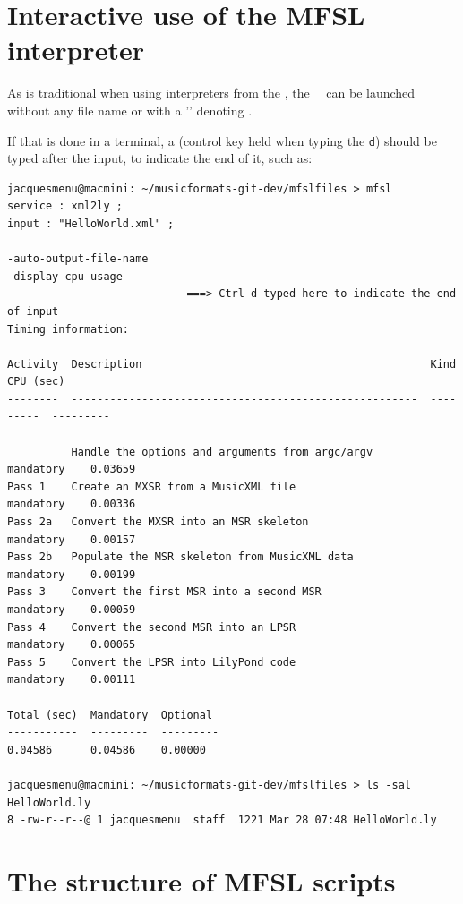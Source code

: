 \section{Interactive use of the MFSL interpreter}

As is traditional when using interpreters from the \CLI, the \mfslInterp\ \mfslExec\ can be launched without any file name or with a '\code{-}' denoting \standardInput.

If that is done in a terminal, a  (control key held when typing the {\tt d}) should be typed after the input, to indicate the end of it, such as:
\begin{lstlisting}[language=Terminal]
jacquesmenu@macmini: ~/musicformats-git-dev/mfslfiles > mfsl
service : xml2ly ;
input : "HelloWorld.xml" ;

-auto-output-file-name
-display-cpu-usage
							===> Ctrl-d typed here to indicate the end of input
Timing information:

Activity  Description                                             Kind       CPU (sec)
--------  ------------------------------------------------------  ---------  ---------

          Handle the options and arguments from argc/argv         mandatory    0.03659
Pass 1    Create an MXSR from a MusicXML file                  mandatory    0.00336
Pass 2a   Convert the MXSR into an MSR skeleton                    mandatory    0.00157
Pass 2b   Populate the MSR skeleton from MusicXML data            mandatory    0.00199
Pass 3    Convert the first MSR into a second MSR                 mandatory    0.00059
Pass 4    Convert the second MSR into an LPSR                     mandatory    0.00065
Pass 5    Convert the LPSR into LilyPond code                 mandatory    0.00111

Total (sec)  Mandatory  Optional
-----------  ---------  ---------
0.04586      0.04586    0.00000

jacquesmenu@macmini: ~/musicformats-git-dev/mfslfiles > ls -sal HelloWorld.ly
8 -rw-r--r--@ 1 jacquesmenu  staff  1221 Mar 28 07:48 HelloWorld.ly
\end{lstlisting}


\section{The structure of MFSL scripts}

